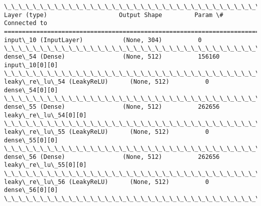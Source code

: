 \documentclass[11pt]{article}
\begin{document}
    \begin{Verbatim}[commandchars=\\\{\}]
\_\_\_\_\_\_\_\_\_\_\_\_\_\_\_\_\_\_\_\_\_\_\_\_\_\_\_\_\_\_\_\_\_\_\_\_\_\_\_\_\_\_\_\_\_\_\_\_\_\_\_\_\_\_\_\_\_\_\_\_\_\_\_\_\_\_\_\_\_\_\_\_\_\_\_\_\_\_\_\_\_\_\_\_\_\_\_\_\_\_\_\_\_\_\_\_\_\_
Layer (type)                    Output Shape         Param \#     Connected to                     
==================================================================================================
input\_10 (InputLayer)           (None, 304)          0                                            
\_\_\_\_\_\_\_\_\_\_\_\_\_\_\_\_\_\_\_\_\_\_\_\_\_\_\_\_\_\_\_\_\_\_\_\_\_\_\_\_\_\_\_\_\_\_\_\_\_\_\_\_\_\_\_\_\_\_\_\_\_\_\_\_\_\_\_\_\_\_\_\_\_\_\_\_\_\_\_\_\_\_\_\_\_\_\_\_\_\_\_\_\_\_\_\_\_\_
dense\_54 (Dense)                (None, 512)          156160      input\_10[0][0]                   
\_\_\_\_\_\_\_\_\_\_\_\_\_\_\_\_\_\_\_\_\_\_\_\_\_\_\_\_\_\_\_\_\_\_\_\_\_\_\_\_\_\_\_\_\_\_\_\_\_\_\_\_\_\_\_\_\_\_\_\_\_\_\_\_\_\_\_\_\_\_\_\_\_\_\_\_\_\_\_\_\_\_\_\_\_\_\_\_\_\_\_\_\_\_\_\_\_\_
leaky\_re\_lu\_54 (LeakyReLU)      (None, 512)          0           dense\_54[0][0]                   
\_\_\_\_\_\_\_\_\_\_\_\_\_\_\_\_\_\_\_\_\_\_\_\_\_\_\_\_\_\_\_\_\_\_\_\_\_\_\_\_\_\_\_\_\_\_\_\_\_\_\_\_\_\_\_\_\_\_\_\_\_\_\_\_\_\_\_\_\_\_\_\_\_\_\_\_\_\_\_\_\_\_\_\_\_\_\_\_\_\_\_\_\_\_\_\_\_\_
dense\_55 (Dense)                (None, 512)          262656      leaky\_re\_lu\_54[0][0]             
\_\_\_\_\_\_\_\_\_\_\_\_\_\_\_\_\_\_\_\_\_\_\_\_\_\_\_\_\_\_\_\_\_\_\_\_\_\_\_\_\_\_\_\_\_\_\_\_\_\_\_\_\_\_\_\_\_\_\_\_\_\_\_\_\_\_\_\_\_\_\_\_\_\_\_\_\_\_\_\_\_\_\_\_\_\_\_\_\_\_\_\_\_\_\_\_\_\_
leaky\_re\_lu\_55 (LeakyReLU)      (None, 512)          0           dense\_55[0][0]                   
\_\_\_\_\_\_\_\_\_\_\_\_\_\_\_\_\_\_\_\_\_\_\_\_\_\_\_\_\_\_\_\_\_\_\_\_\_\_\_\_\_\_\_\_\_\_\_\_\_\_\_\_\_\_\_\_\_\_\_\_\_\_\_\_\_\_\_\_\_\_\_\_\_\_\_\_\_\_\_\_\_\_\_\_\_\_\_\_\_\_\_\_\_\_\_\_\_\_
dense\_56 (Dense)                (None, 512)          262656      leaky\_re\_lu\_55[0][0]             
\_\_\_\_\_\_\_\_\_\_\_\_\_\_\_\_\_\_\_\_\_\_\_\_\_\_\_\_\_\_\_\_\_\_\_\_\_\_\_\_\_\_\_\_\_\_\_\_\_\_\_\_\_\_\_\_\_\_\_\_\_\_\_\_\_\_\_\_\_\_\_\_\_\_\_\_\_\_\_\_\_\_\_\_\_\_\_\_\_\_\_\_\_\_\_\_\_\_
leaky\_re\_lu\_56 (LeakyReLU)      (None, 512)          0           dense\_56[0][0]                   
\_\_\_\_\_\_\_\_\_\_\_\_\_\_\_\_\_\_\_\_\_\_\_\_\_\_\_\_\_\_\_\_\_\_\_\_\_\_\_\_\_\_\_\_\_\_\_\_\_\_\_\_\_\_\_\_\_\_\_\_\_\_\_\_\_\_\_\_\_\_\_\_\_\_\_\_\_\_\_\_\_\_\_\_\_\_\_\_\_\_\_\_\_\_\_\_\_\_

\end{Verbatim}
\end{document}
